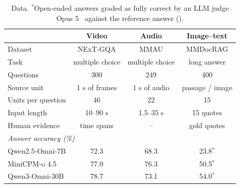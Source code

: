 \begin{table}[t]
\centering
\tablesize
\setlength{\tabcolsep}{2.2pt}
\begin{tabular}{lccc}
\toprule
 & \textbf{Video} & \textbf{Audio} & \textbf{Image--text}\\
\midrule
Dataset & NExT-GQA & MMAU & MMDocRAG \\
Task & multiple choice & multiple choice & long answer \\
Questions  & 300 & 249  & 400  \\
Source unit & 1 s of frames & 1 s of audio & passage / image \\
Units per question & 46 & 22 & 15 \\
Input length & 10--90 s & 1.5--35 s & 15 quotes \\
Human evidence & time spans & -- & gold quotes \\
\midrule
\multicolumn{4}{l}{\textit{Answer accuracy (\%)}}\\
Qwen2.5-Omni-7B & 72.3 & 68.3 & 23.8$^\ast$ \\
MiniCPM-o 4.5 & 77.0 & 76.3 & 50.5$^\ast$ \\
Qwen3-Omni-30B & 78.7 & 73.1 & 54.0$^\ast$ \\
\bottomrule
\end{tabular}
\caption{Data. $^\ast$Open-ended answers graded as fully correct by an LLM judge Opus 5~\cite{anthropic2026opus5} against the reference answer ().}
\label{tab:stats}
\skiptableend
\end{table}

